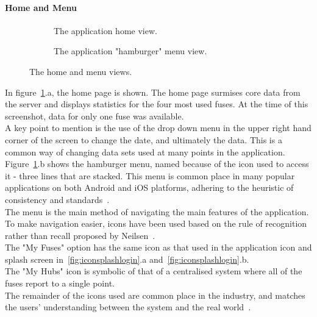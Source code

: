 \documentclass[preprint,12pt,3p]{elsarticle}
\begin{document}
\paragraph{Home and Menu}
\begin{figure}[H]
    \centering
    \begin{subfigure}[t]{0.32\columnwidth}
        \centering
        \caption{The application home view.}
    \end{subfigure}
    \begin{subfigure}[t]{0.32\columnwidth}
        \centering
        \caption{The application "hamburger" menu view.}
    \end{subfigure}
    \caption{The home and menu views.}
    \label{fig:homemenu}
\end{figure}
In figure~\ref{fig:homemenu}.a, the home page is shown. The home page surmises core data from the server and displays statistics for the four most used fuses. At the time of this screenshot, data for only one fuse was available.\\
A key point to mention is the use of the drop down menu in the upper right hand corner of the screen to change the date, and ultimately the data. This is a common way of changing data sets used at many points in the application.\\
Figure~\ref{fig:homemenu}.b shows the hamburger menu, named because of the icon used to access it - three lines that are stacked. This menu is common place in many popular applications on both Android and iOS platforms, adhering to the heuristic of consistency and standards~\cite{nielsen}.\\
The menu is the main method of navigating the main features of the application. To make navigation easier, icons have been used based on the rule of recognition rather than recall proposed by Neilsen~\cite{nielsen}.\\
The "My Fuses" option has the same icon as that used in the application icon and splash screen in~\ref{fig:iconsplashlogin}.a and~\ref{fig:iconsplashlogin}.b.\\ 
The "My Hubs" icon is symbolic of that of a centralised system where all of the fuses report to a single point.\\ 
The remainder of the icons used are common place in the industry, and matches the users' understanding between the system and the real world~\cite{nielsen}.
\end{document}
